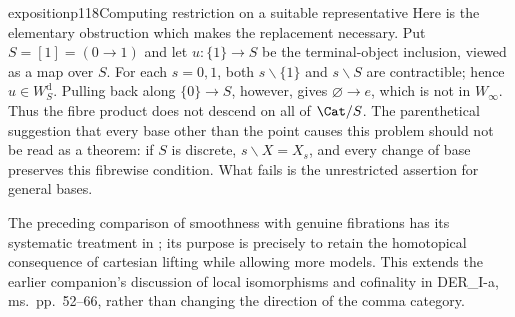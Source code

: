 \begin{dcomment}{exposition}{p118}{Computing restriction on a suitable representative}
Here is the elementary obstruction which makes the replacement necessary. Put $S=[1]=(0\to1)$ and let $u:\{1\}\to S$ be the terminal-object inclusion, viewed as a map over $S$. For each $s=0,1$, both $s\backslash\{1\}$ and $s\backslash S$ are contractible; hence $u\in W_S^{\mathrm d}$. Pulling back along $\{0\}\to S$, however, gives $\varnothing\to e$, which is not in $W_\infty$. Thus the fibre product does not descend on all of $\Cat/S$. The parenthetical suggestion that every base other than the point causes this problem should not be read as a theorem: if $S$ is discrete, $s\backslash X=X_s$, and every change of base preserves this fibrewise condition. What fails is the unrestricted assertion for general bases.

The preceding comparison of smoothness with genuine fibrations has its systematic treatment in \citet{Maltsiniotis2005Asphericite}; its purpose is precisely to retain the homotopical consequence of cartesian lifting while allowing more models. This extends the earlier companion's discussion of local isomorphisms and cofinality in DER\_I-a, ms.~pp.~52--66, rather than changing the direction of the comma category.
\end{dcomment}

